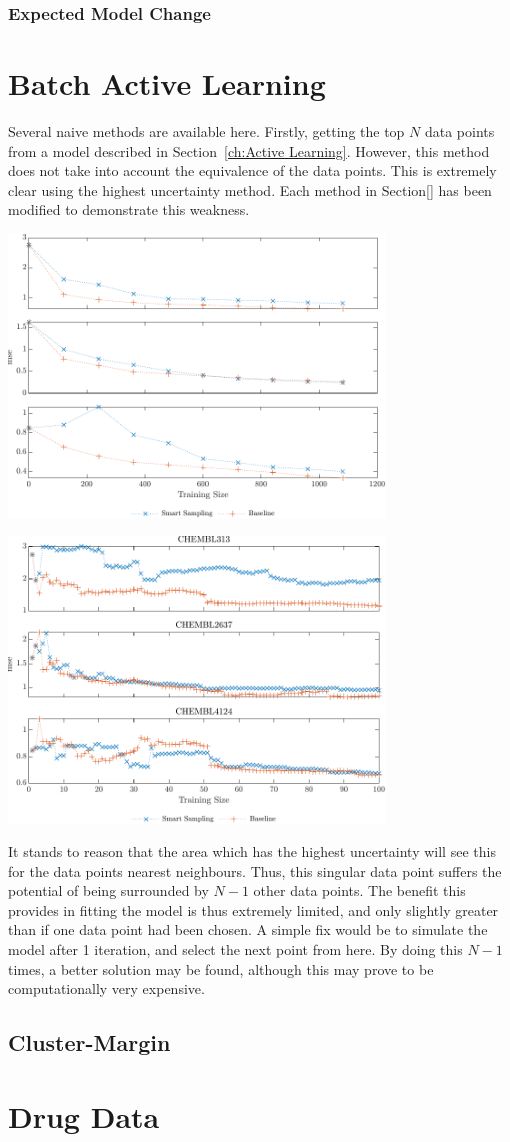 \documentclass[a4paper, english]{report}
\begin{document}
\subsubsection{Expected Model Change}

\section{Batch Active Learning}
Several naive methods are available here. Firstly, getting the top $N$ data points from a model described in Section~\ref{ch:Active Learning}. However, this method does not take into account the equivalence of the data points. This is extremely clear using the highest uncertainty method. Each method in Section[] has been modified to demonstrate this weakness.

\includegraphics[width=100mm]{BKB_10_120_all3.pdf}

\includegraphics[width=100mm]{US_10_120_all3.pdf}



It stands to reason that the area which has the highest uncertainty will see this for the data points nearest neighbours. Thus, this singular data point suffers the potential of being surrounded by $N-1$ other data points. The benefit this provides in fitting the model is thus extremely limited, and only slightly greater than if one data point had been chosen. A simple fix would be to simulate the model after 1 iteration, and select the next point from here. By doing this $N-1$ times, a better solution may be found, although this may prove to be computationally very expensive.
\subsection{Cluster-Margin}
\section{Drug Data}
\blindtext[2]{}

\printbibliography{}
\appendix
\end{document}
